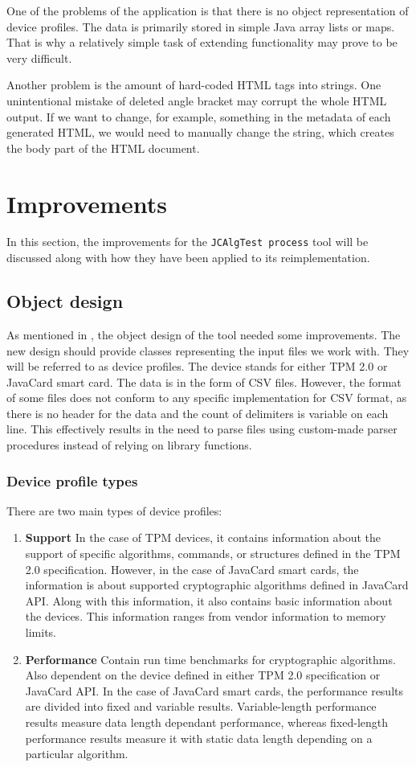 One of the problems of the application is that there is no object representation of device profiles. The data is primarily stored in simple Java array lists or maps. That is why a relatively simple task of extending functionality may prove to be very difficult. 

Another problem is the amount of hard-coded HTML tags into strings. One unintentional mistake of deleted angle bracket may corrupt the whole HTML output. If we want to change, for example, something in the metadata of each generated HTML, we would need to manually change the string, which creates the body part of the HTML document. 

\section{Improvements}
In this section, the improvements for the \texttt{JCAlgTest process} tool will be discussed along with how they have been applied to its reimplementation.

\subsection{Object design}
As mentioned in , the object design of the tool needed some improvements. The new design should provide classes representing the input files we work with. They will be referred to as device profiles. The device stands for either TPM 2.0 or JavaCard smart card. The data is in the form of CSV files. However, the format of some files does not conform to any specific implementation for CSV format, as there is no header for the data and the count of delimiters is variable on each line. This effectively results in the need to parse files using custom-made parser procedures instead of relying on library functions.

\subsubsection{Device profile types}
There are two main types of device profiles:
\begin{enumerate}
    \item \textbf{Support} In the case of TPM devices, it contains information about the support of specific algorithms, commands, or structures defined in the TPM 2.0 specification. However, in the case of JavaCard smart cards, the information is about supported cryptographic algorithms defined in JavaCard API. Along with this information, it also contains basic information about the devices. This information ranges from vendor information to memory limits.
    
    \item \textbf{Performance} Contain run time benchmarks for cryptographic algorithms. Also dependent on the device defined in either TPM 2.0 specification or JavaCard API. In the case of JavaCard smart cards, the performance results are divided into fixed and variable results. Variable-length performance results measure data length dependant performance, whereas fixed-length performance results measure it with static data length depending on a particular algorithm.
\end{enumerate}

